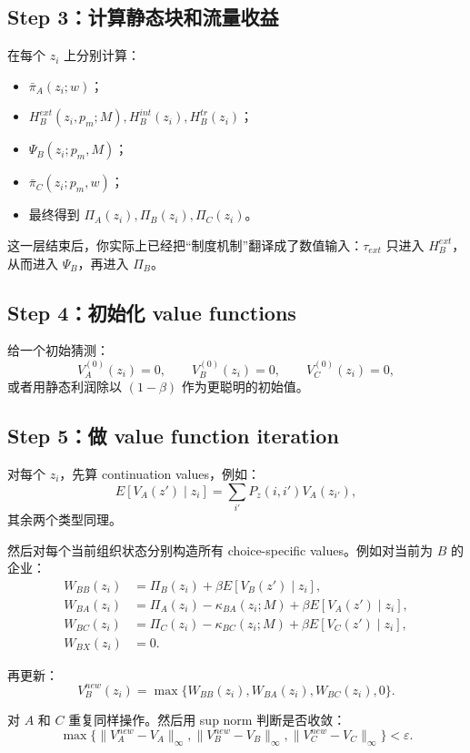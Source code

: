 \documentclass[12pt]{ctexart}
\begin{document}
\subsection{Step 3：计算静态块和流量收益}

在每个 $z_i$ 上分别计算：
\begin{itemize}
    \item $\bar\pi_A(z_i;w)$；
    \item $H_B^{ext}(z_i,p_m;M),H_B^{int}(z_i),H_B^{tr}(z_i)$；
    \item $\Psi_B(z_i;p_m,M)$；
    \item $\bar\pi_C(z_i;p_m,w)$；
    \item 最终得到 $\Pi_A(z_i),\Pi_B(z_i),\Pi_C(z_i)$。
\end{itemize}

这一层结束后，你实际上已经把“制度机制”翻译成了数值输入：$\tau_{ext}$ 只进入 $H_B^{ext}$，从而进入 $\Psi_B$，再进入 $\Pi_B$。

\subsection{Step 4：初始化 value functions}

给一个初始猜测：
\[
V_A^{(0)}(z_i)=0,
\qquad
V_B^{(0)}(z_i)=0,
\qquad
V_C^{(0)}(z_i)=0,
\]
或者用静态利润除以 $(1-\beta)$ 作为更聪明的初始值。

\subsection{Step 5：做 value function iteration}

对每个 $z_i$，先算 continuation values，例如：
\[
E[V_A(z')\mid z_i]=\sum_{i'}P_z(i,i')V_A(z_{i'}),
\]
其余两个类型同理。

然后对每个当前组织状态分别构造所有 choice-specific values。例如对当前为 $B$ 的企业：
\begin{align*}
W_{BB}(z_i)&=\Pi_B(z_i)+\beta E[V_B(z')\mid z_i],\\
W_{BA}(z_i)&=\Pi_A(z_i)-\kappa_{BA}(z_i;M)+\beta E[V_A(z')\mid z_i],\\
W_{BC}(z_i)&=\Pi_C(z_i)-\kappa_{BC}(z_i;M)+\beta E[V_C(z')\mid z_i],\\
W_{BX}(z_i)&=0.
\end{align*}

再更新：
\[
V_B^{new}(z_i)=\max\{W_{BB}(z_i),W_{BA}(z_i),W_{BC}(z_i),0\}.
\]

对 $A$ 和 $C$ 重复同样操作。然后用 sup norm 判断是否收敛：
\[
\max\big\{
\|V_A^{new}-V_A\|_\infty,
\|V_B^{new}-V_B\|_\infty,
\|V_C^{new}-V_C\|_\infty
\big\}<\varepsilon.
\]
\end{document}
